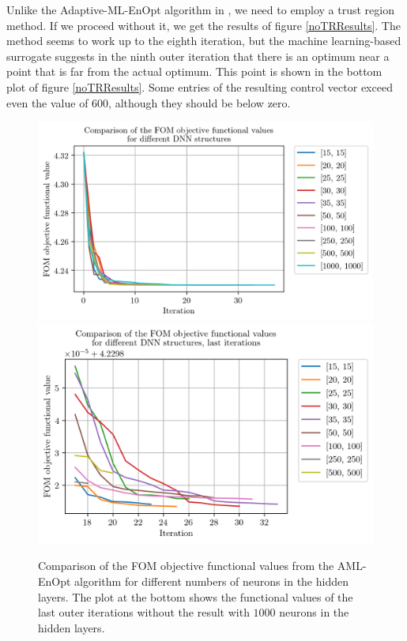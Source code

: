 Unlike the Adaptive-ML-EnOpt algorithm in \cite{Keil2022-dj}, we need to employ a trust region method. If we proceed without it, we get the results of figure \ref{noTRResults}. The method seems to work up to the eighth iteration, but the machine learning-based surrogate suggests in the ninth outer iteration that there is an optimum near a point that is far from the actual optimum. This point is shown in the bottom plot of figure \ref{noTRResults}. Some entries of the resulting control vector exceed even the value of $600$, although they should be below zero.

\begin{figure}
\centering
\includegraphics{Plots/DNNStruct.png}
\includegraphics{Plots/DNNStructLastIter.png}
\caption{\label{DNNStructComparison}Comparison of the FOM objective functional values from the AML-EnOpt algorithm for different numbers of neurons in the hidden layers. The plot at the bottom shows the functional values of the last outer iterations without the result with $1000$ neurons in the hidden layers.}
\end{figure}


